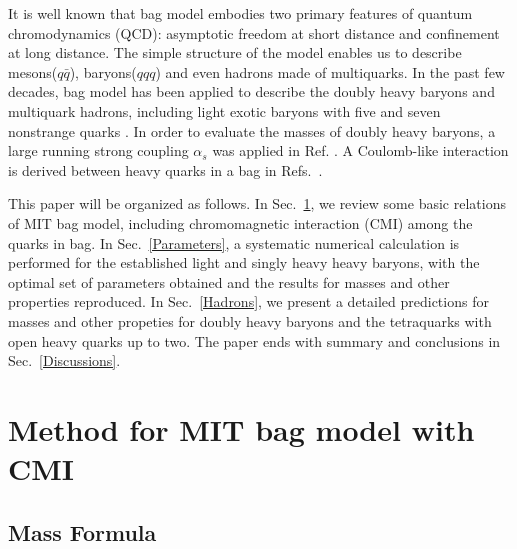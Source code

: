 \documentclass[prd,twocolumn,floatfix,nofootinbib]{revtex4}
\begin{document}
It is well known that bag model \cite{DeGrand:1975cf} embodies two primary
features of quantum chromodynamics (QCD): asymptotic freedom at short
distance and confinement at long distance. The simple structure of the model
enables us to describe mesons($q\bar{q}$), baryons($qqq$) and even hadrons
made of multiquarks. In the past few decades, bag model has been applied to
describe the doubly heavy baryons\cite%
{Fleck:1989mb,He:2004px,Bernotas:2012nz} and multiquark hadrons, including
light exotic baryons with five and seven nonstrange quarks \cite%
{Strottman:1979qu}. In order to evaluate the masses of doubly heavy baryons,
a large running strong coupling $\alpha _{s}$ was applied in Ref. \cite%
{He:2004px}. A Coulomb-like interaction is derived between heavy quarks in a
bag in Refs.~\cite{Haxton:1980mc,Aerts:1980rf}.

This paper will be organized as follows. In Sec.~\ref{Method}, we review
some basic relations of MIT bag model, including chromomagnetic interaction
(CMI) among the quarks in bag. In Sec.~\ref{Parameters}, a systematic
numerical calculation is performed for the established light and singly
heavy heavy baryons, with the optimal set of parameters obtained and the
results for masses and other properties reproduced. In Sec.~\ref{Hadrons},
we present a detailed predictions for masses and other propeties for doubly
heavy baryons and the tetraquarks with open heavy quarks up to two. The
paper ends with summary and conclusions in Sec.~\ref{Discussions}.

\section{Method for MIT bag model with CMI}

\label{Method}

\subsection{Mass Formula}
\end{document}
